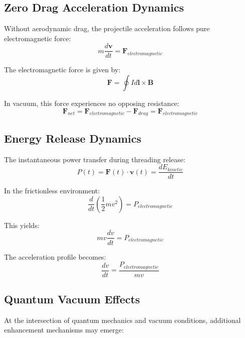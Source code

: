 \documentclass[12pt,a4paper]{article}
\begin{document}
\subsection{Zero Drag Acceleration Dynamics}

Without aerodynamic drag, the projectile acceleration follows pure electromagnetic force:
\begin{equation}
m\frac{d\mathbf{v}}{dt} = \mathbf{F}_{electromagnetic}
\end{equation}

The electromagnetic force is given by:
\begin{equation}
\mathbf{F} = \oint I d\mathbf{l} \times \mathbf{B}
\end{equation}

In vacuum, this force experiences no opposing resistance:
\begin{equation}
\mathbf{F}_{net} = \mathbf{F}_{electromagnetic} - \mathbf{F}_{drag} = \mathbf{F}_{electromagnetic}
\end{equation}

\subsection{Energy Release Dynamics}

The instantaneous power transfer during threading release:
\begin{equation}
P(t) = \mathbf{F}(t) \cdot \mathbf{v}(t) = \frac{dE_{kinetic}}{dt}
\end{equation}

In the frictionless environment:
\begin{equation}
\frac{d}{dt}\left(\frac{1}{2}mv^2\right) = P_{electromagnetic}
\end{equation}

This yields:
\begin{equation}
mv\frac{dv}{dt} = P_{electromagnetic}
\end{equation}

The acceleration profile becomes:
\begin{equation}
\frac{dv}{dt} = \frac{P_{electromagnetic}}{mv}
\end{equation}

\subsection{Quantum Vacuum Effects}

At the intersection of quantum mechanics and vacuum conditions, additional enhancement mechanisms may emerge:
\end{document}

